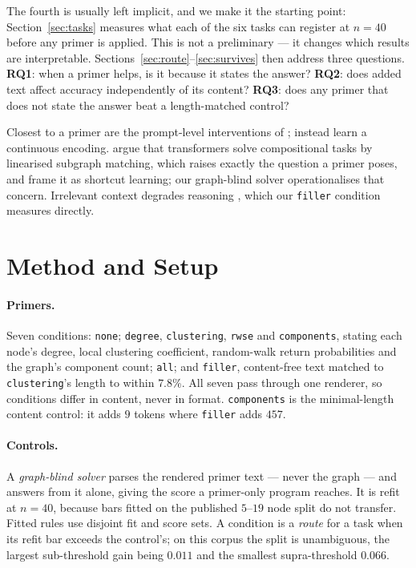 \documentclass[11pt]{article}
\begin{document}
The fourth is usually left implicit, and we make it the starting point:
Section~\ref{sec:tasks} measures what each of the six tasks can register at
$n{=}40$ before any primer is applied. This is not a preliminary --- it changes
which results are interpretable. Sections~\ref{sec:route}--\ref{sec:survives}
then address three questions. \textbf{RQ1}: when a primer helps, is it because
it states the answer? \textbf{RQ2}: does added text affect accuracy
independently of its content? \textbf{RQ3}: does any primer that does not state
the answer beat a length-matched control?

Closest to a primer are the prompt-level interventions of
\citet{wang2023nlgraph}; \citet{perozzi2024letyourgraph} instead learn a
continuous encoding. \citet{dziri2023faithandfate} argue that transformers
solve compositional tasks by linearised subgraph matching, which raises exactly
the question a primer poses, and \citet{geirhos2020shortcut} frame it as
shortcut learning; our graph-blind solver operationalises that concern.
Irrelevant context degrades reasoning \citep{shi2023distracted}, which our
\texttt{filler} condition measures directly.

\section{Method and Setup}
\label{sec:method}

\paragraph{Primers.} Seven conditions: \texttt{none}; \texttt{degree},
\texttt{clustering}, \texttt{rwse} and \texttt{components}, stating each node's
degree, local clustering coefficient, random-walk return probabilities
\citep{dwivedi2022graph} and the graph's component count; \texttt{all};
and \texttt{filler}, content-free text matched to \texttt{clustering}'s length
to within $7.8\%$. All seven pass through one renderer, so conditions differ in
content, never in format. \texttt{components} is the minimal-length content
control: it adds $9$ tokens where \texttt{filler} adds $457$.

\paragraph{Controls.} A \emph{graph-blind solver} parses the rendered primer
text --- never the graph --- and answers from it alone, giving the score a
primer-only program reaches. It is refit at $n{=}40$, because bars fitted on
the published $5$--$19$ node split do not transfer. Fitted rules use disjoint
fit and score sets. A condition is a \emph{route} for a task when its refit bar
exceeds the control's; on this corpus the split is unambiguous, the largest
sub-threshold gain being $0.011$ and the smallest supra-threshold $0.066$.
\end{document}
